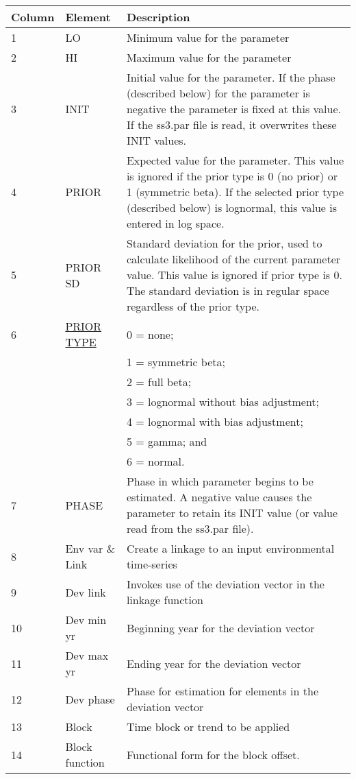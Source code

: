 \hypertarget{Priors}{} \hypertarget{paraOrder}{}
\begin{center}
	\begin{tabular}{p{2cm} p{3cm} p{10cm}}
		\hline
		Column & Element & Description \Tstrut\Bstrut\\
		\hline
		1 & LO & Minimum value for the parameter \Tstrut\\
		2 & HI & Maximum value for the parameter \Tstrut\\
		3 \Tstrut & INIT & Initial value for the parameter. If the phase (described below) for the parameter is negative the parameter is fixed at this value. If the ss3.par file is read, it overwrites these INIT values.\\
		4 \Tstrut & PRIOR & Expected value for the parameter. This value is ignored if the prior type is 0 (no prior) or 1 (symmetric beta). If the selected prior type (described below) is lognormal, this value is entered in log space. \\
		5 \Tstrut & PRIOR SD & Standard deviation for the prior, used to calculate likelihood of the current parameter value. This value is ignored if prior type is 0. The standard deviation is in regular space regardless of the prior type. \\
		6 \Tstrut & \hyperlink{PriorDescrip}{PRIOR TYPE} & 0 = none; \\
		& & 1 = symmetric beta; \\
		& & 2 = full beta; \\
		& & 3 = lognormal without bias adjustment; \\
		& & 4 = lognormal with bias adjustment; \\
		& & 5 = gamma; and \\
		& & 6 = normal. \\
		7 \Tstrut & PHASE & Phase in which parameter begins to be estimated. A negative value causes the parameter to retain its INIT value (or value read from the ss3.par file). \Bstrut\\
		8 \Tstrut & Env var \& Link & Create a linkage to an input environmental time-series \\
		9 \Tstrut & Dev link & Invokes use of the deviation vector in the linkage function \\
		10 \Tstrut & Dev min yr & Beginning year for the deviation vector \\
		11 \Tstrut & Dev max yr & Ending year for the deviation vector \\
		12 \Tstrut & Dev phase & Phase for estimation for elements in the deviation vector \\
		13 \Tstrut & Block & Time block or trend to be applied \\
		14 \Tstrut & Block function & Functional form for the block offset. \Bstrut\\
		\hline
	\end{tabular}
\end{center}

